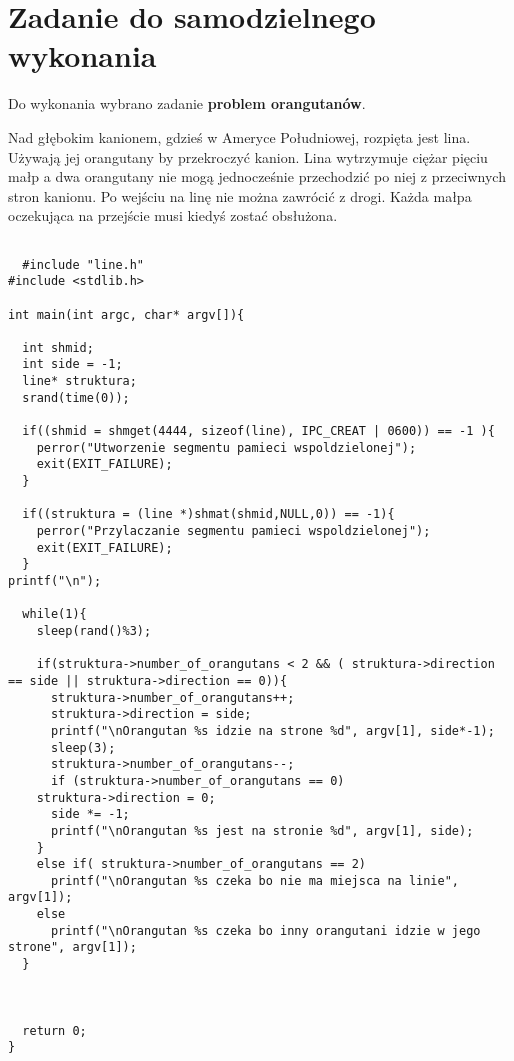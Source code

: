 \documentclass[a4paper,15pt]{article}
\newcommand{\assignment}[2]{
    \begin{tcolorbox}[colback=black!5!white,colframe=black,title={Zadanie #1}]
        #2
    \end{tcolorbox}
}
\begin{document}
\section{Zadanie do samodzielnego wykonania}

Do wykonania wybrano zadanie \textbf{problem orangutanów}.
\assignment{ 
}{Nad głębokim kanionem, gdzieś w Ameryce Południowej, rozpięta jest lina. Używają jej orangutany by przekroczyć kanion. Lina wytrzymuje ciężar pięciu małp a dwa orangutany nie mogą jednocześnie przechodzić po niej z przeciwnych stron kanionu. Po wejściu na linę nie można zawrócić z drogi. Każda małpa oczekująca na przejście musi kiedyś zostać obsłużona.}



\begin{lstlisting}[style=CStyle, label=some-code, caption=orangutan.c]
	
  #include "line.h"
#include <stdlib.h>

int main(int argc, char* argv[]){
  
  int shmid;
  int side = -1;
  line* struktura;
  srand(time(0));

  if((shmid = shmget(4444, sizeof(line), IPC_CREAT | 0600)) == -1 ){
    perror("Utworzenie segmentu pamieci wspoldzielonej");
    exit(EXIT_FAILURE);
  }
 
  if((struktura = (line *)shmat(shmid,NULL,0)) == -1){
    perror("Przylaczanie segmentu pamieci wspoldzielonej");
    exit(EXIT_FAILURE);
  }
printf("\n");

  while(1){   
    sleep(rand()%3);
    
    if(struktura->number_of_orangutans < 2 && ( struktura->direction == side || struktura->direction == 0)){
      struktura->number_of_orangutans++;
      struktura->direction = side;
      printf("\nOrangutan %s idzie na strone %d", argv[1], side*-1);
      sleep(3);    
      struktura->number_of_orangutans--;
      if (struktura->number_of_orangutans == 0)
	struktura->direction = 0;
      side *= -1;
      printf("\nOrangutan %s jest na stronie %d", argv[1], side);
    }
    else if( struktura->number_of_orangutans == 2)
      printf("\nOrangutan %s czeka bo nie ma miejsca na linie", argv[1]);
    else
      printf("\nOrangutan %s czeka bo inny orangutani idzie w jego strone", argv[1]);
  }
  
  

  return 0;
}
	
\end{lstlisting}
\end{document}
